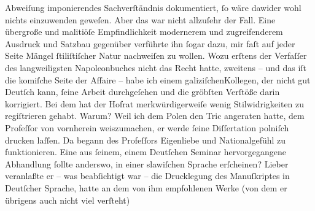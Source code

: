 \begin{ledgroupsized}[t]{13cm}
                    Abweiſung imponierendes Sachverſtändnis dokumentiert, ſo wäre dawider wohl
                    nichts einzuwenden geweſen. Aber das war nicht allzuſehr der Fall. Eine
                    übergroße und malitiöſe Empfindlichkeit modernerem und zugreifenderem Ausdruck
                    und Satzbau gegenüber verführte ihn ſogar dazu, mir faſt auf jeder Seite Mängel
                    ſtiliſtiſcher Natur nachweiſen zu wollen. Wozu erſtens der Verfaſſer des langweiligsten Napoleonbuches nicht das Recht
                    hatte, zweitens – und das iſt die komiſche Seite der Affaire – habe ich einem
                        galiziſchenKollegen, der nicht gut
                    Deutſch kann, ſeine Arbeit durchgeſehen und die gröbſten Verſtöße darin
                    korrigiert. Bei dem hat der Hofrat merkwürdigerweiſe wenig Stilwidrigkeiten zu regiſtrieren
                    gehabt. Warum? Weil ich dem Polen den Tric
                    angeraten hatte, dem Profeſſor von vornherein weiszumachen, er werde ſeine Diſſertation polniſch drucken laſſen. Da begann des Profeſſors Eigenliebe und
                    Nationalgefühl zu funktionieren. Eine aus ſeinem, einem Deutſchen Seminar
                    hervorgegangene Abhandlung ſollte anderswo, in einer slawiſchen Sprache
                    erſcheinen? Lieber veranlaßte er – was beabſichtigt war – die Drucklegung des
                    Manuſkriptes in Deutſcher Sprache, {\pb}hatte an dem von ihm empfohlenen Werke (von dem er übrigens auch nicht viel verſteht)

\end{ledgroupsized}
